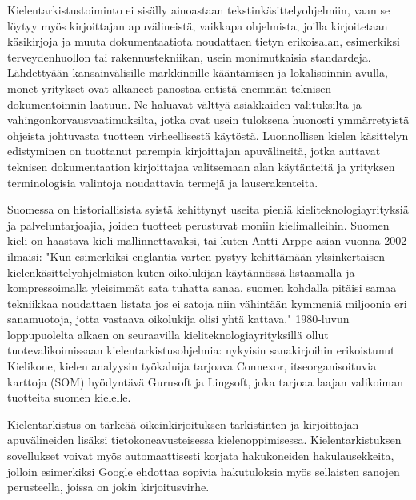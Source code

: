 \documentclass{../../metanetpaper}
\begin{document}
\begin{Parallel}[c]{79mm}{78mm}
{%

Kielentarkistustoiminto ei sisälly ainoastaan
tekstinkäsittelyohjelmiin, vaan se löytyy myös kirjoittajan
apuvälineistä, vaikkapa ohjelmista, joilla kirjoitetaan käsikirjoja ja muuta
dokumentaatiota noudattaen tietyn erikoisalan, esimerkiksi
terveydenhuollon tai rakennustekniikan, usein monimutkaisia
standardeja. Lähdettyään kansainvälisille markkinoille kääntämisen ja 
lokalisoinnin avulla, monet yritykset ovat alkaneet
panostaa entistä enemmän teknisen dokumentoinnin laatuun. Ne haluavat
välttyä asiakkaiden valituksilta ja vahingonkorvausvaatimuksilta,
jotka ovat usein tuloksena huonosti ymmärretyistä ohjeista johtuvasta
tuotteen virheellisestä käytöstä. Luonnollisen kielen
käsittelyn edistyminen on tuottanut parempia kirjoittajan
apuvälineitä, jotka auttavat teknisen dokumentaation kirjoittajaa 
valitsemaan alan käytänteitä ja yrityksen terminologisia
valintoja noudattavia termejä ja lauserakenteita.

Suomessa on historiallisista syistä kehittynyt useita pieniä
kieliteknologiayrityksiä ja palveluntarjoajia, joiden tuotteet
perustuvat moniin kielimalleihin. Suomen kieli on haastava kieli
mallinnettavaksi, tai kuten Antti Arppe asian vuonna 2002 ilmaisi:
"Kun esimerkiksi englantia varten pystyy kehittämään yksinkertaisen
kielenkäsittelyohjelmiston kuten oikolukijan käytännössä listaamalla
ja kompressoimalla yleisimmät sata tuhatta sanaa, suomen kohdalla
pitäisi samaa tekniikkaa noudattaen listata jos ei satoja niin
vähintään kymmeniä miljoonia eri sanamuotoja, jotta vastaava
oikolukija olisi yhtä kattava." \cite{EiPolkua} 1980-luvun
loppupuolelta alkaen on seuraavilla kieliteknologiayrityksillä ollut
tuotevalikoimissaan kielentarkistusohjelmia: nykyisin sanakirjoihin erikoistunut
Kielikone, kielen analyysin työkaluija tarjoava Connexor, itseorganisoituvia 
karttoja (SOM) hyödyntävä Gurusoft ja Lingsoft, joka tarjoaa laajan valikoiman 
tuotteita suomen kielelle.

Kielentarkistus on tärkeää oikeinkirjoituksen tarkistinten ja
kirjoittajan apuvälineiden lisäksi tietokoneavusteisessa
kielenoppimisessa.  Kielentarkistuksen sovellukset voivat myös
automaattisesti korjata hakukoneiden hakulausekkeita, jolloin
esimerkiksi Google ehdottaa sopivia hakutuloksia myös sellaisten
sanojen perusteella, joissa on jokin kirjoitusvirhe.
}


\end{Parallel}
\end{document}
